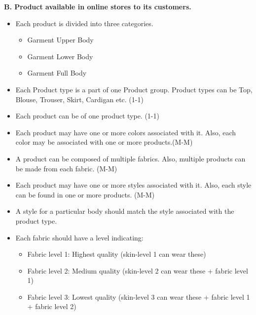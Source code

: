 \documentclass[11pt,journal,compsoc]{IEEEtran}
\begin{document}
\textbf{B. Product available in online stores to its customers.}
\begin{itemize}
\item[\ding{220}]Each product is divided into three categories. 
\begin{itemize}
    \item Garment Upper Body 
    \item Garment Lower Body 
    \item Garment Full Body 
\end{itemize}
\item[\ding{220}]Each Product type is a part of one Product group. Product types can be Top, Blouse, Trouser, Skirt, Cardigan etc. (1-1) 
\item[\ding{220}]Each product can be of one product type. (1-1) 
\item[\ding{220}]Each product may have one or more colors associated with it. Also, each color may be associated with one or more products.(M-M) 
\item[\ding{220}]A product can be composed of multiple fabrics. Also, multiple products can be made from each fabric. (M-M) 
\item[\ding{220}]Each product may have one or more styles associated with it. Also, each style can be found in one or more products. (M-M) 
\item[\ding{220}]A style for a particular body should match the style associated with the product type. 
\item[\ding{220}]Each fabric should have a level indicating: 
\begin{itemize}
    \item Fabric level 1: Highest quality (skin-level 1 can wear these) 
    \item Fabric level 2: Medium quality (skin-level 2 can wear these + fabric level 1)
    \item Fabric level 3: Lowest quality (skin-level 3 can wear these + fabric level 1 + fabric level 2)
\end{itemize}
\end{itemize}
\end{document}
